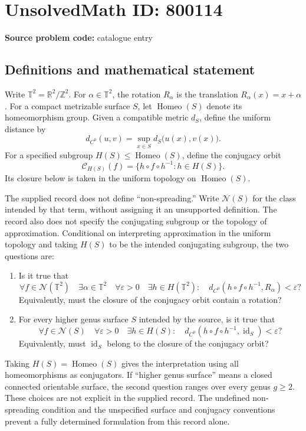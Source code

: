 \documentclass[11pt]{article}
\newcommand{\Z}{\mathbb{Z}}
\newcommand{\R}{\mathbb{R}}
\begin{document}
\section*{UnsolvedMath ID: 800114}
\textbf{Source problem code:} catalogue entry
\subsection{Definitions and mathematical statement}
Write \(\mathbb T^2=\R^2/\Z^2\). For \(\alpha\in\mathbb T^2\), the rotation \(R_\alpha\) is the translation \(R_\alpha(x)=x+\alpha\). For a compact metrizable surface \(S\), let \(\operatorname{Homeo}(S)\) denote its homeomorphism group. Given a compatible metric \(d_S\), define the uniform distance by
\[
d_{C^0}(u,v)=\sup_{x\in S}d_S\bigl(u(x),v(x)\bigr).
\]
For a specified subgroup \(H(S)\leq\operatorname{Homeo}(S)\), define the conjugacy orbit
\[
\mathcal C_{H(S)}(f)=\{h\circ f\circ h^{-1}:h\in H(S)\}.
\]
Its closure below is taken in the uniform topology on \(\operatorname{Homeo}(S)\).

The supplied record does not define ``non-spreading.'' Write \(\mathcal N(S)\) for the class intended by that term, without assigning it an unsupported definition. The record also does not specify the conjugating subgroup or the topology of approximation. Conditional on interpreting approximation in the uniform topology and taking \(H(S)\) to be the intended conjugating subgroup, the two questions are:
\begin{enumerate}
\item Is it true that
\[
\forall f\in\mathcal N(\mathbb T^2)\quad
\exists\alpha\in\mathbb T^2\quad
\forall\varepsilon>0\quad
\exists h\in H(\mathbb T^2):\quad
 d_{C^0}(h\circ f\circ h^{-1},R_\alpha)<\varepsilon?
\]
Equivalently, must the closure of the conjugacy orbit contain a rotation?
\item For every higher genus surface \(S\) intended by the source, is it true that
\[
\forall f\in\mathcal N(S)\quad
\forall\varepsilon>0\quad
\exists h\in H(S):\quad
 d_{C^0}(h\circ f\circ h^{-1},\operatorname{id}_S)<\varepsilon?
\]
Equivalently, must \(\operatorname{id}_S\) belong to the closure of the conjugacy orbit?
\end{enumerate}
Taking \(H(S)=\operatorname{Homeo}(S)\) gives the interpretation using all homeomorphisms as conjugators. If ``higher genus surface'' means a closed connected orientable surface, the second question ranges over every genus \(g\geq2\). These choices are not explicit in the supplied record. The undefined non-spreading condition and the unspecified surface and conjugacy conventions prevent a fully determined formulation from this record alone.
\end{document}
